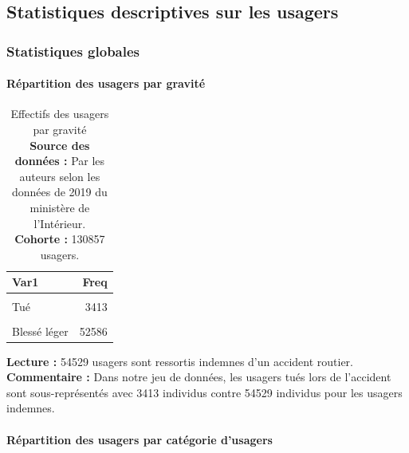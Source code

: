 \documentclass[french,]{tp}
\let\oldparagraph\paragraph
\renewcommand{\paragraph}[1]{\oldparagraph{#1}\mbox{}}
\begin{document}
\hypertarget{statistiques-descriptives-sur-les-usagers}{%
\subsection{Statistiques descriptives sur les usagers}\label{statistiques-descriptives-sur-les-usagers}}

\hypertarget{stat-glob}{%
\subsubsection{Statistiques globales}\label{stat-glob}}

\hypertarget{ruxe9partition-des-usagers-par-gravituxe9}{%
\paragraph{Répartition des usagers par gravité}\label{ruxe9partition-des-usagers-par-gravituxe9}}





\begin{table}[H]

\caption{\label{tab:tablegrav}Effectifs des usagers par gravité\\
\textbf{Source des données :} Par les auteurs selon les données de 2019 du ministère de l'Intérieur.\\
\textbf{Cohorte :} 130857 usagers.\\}
\centering
\begin{tabular}[t]{lr}
\toprule
\textbf{Var1} & \textbf{Freq}\\
\midrule
\cellcolor{gray!6}{Indemne} & \cellcolor{gray!6}{54529}\\
Tué & 3413\\
\cellcolor{gray!6}{Blessé hospitalisé} & \cellcolor{gray!6}{20329}\\
Blessé léger & 52586\\
\bottomrule
\end{tabular}
\end{table}

\textbf{Lecture :} 54529 usagers sont ressortis indemnes d'un accident routier.\\
\textbf{Commentaire :} Dans notre jeu de données, les usagers tués lors de l'accident sont sous-représentés avec 3413 individus contre 54529 individus pour les usagers indemnes.

\hypertarget{ruxe9partition-des-usagers-par-catuxe9gorie-dusagers}{%
\paragraph{Répartition des usagers par catégorie d'usagers}\label{ruxe9partition-des-usagers-par-catuxe9gorie-dusagers}}
\end{document}
